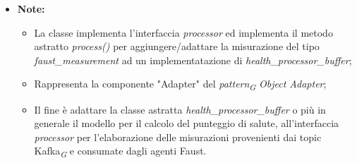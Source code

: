 \begin{itemize}
\begin{itemize}
\begin{itemize}
    \end{itemize}
    \item\textbf{Note:}
        \begin{itemize}
            \item La classe implementa l'interfaccia \textit{processor} ed implementa il metodo astratto \textit{process()} per aggiungere/adattare la misurazione del tipo \textit{faust\_measurement} ad un implementatazione di \textit{health\_processor\_buffer};
            \item Rappresenta la componente "Adapter" del \textit{pattern}\textsubscript{\textit{G}} \textit{Object Adapter};
            \item Il fine è adattare la classe astratta \textit{health\_processor\_buffer} o più in generale il modello per il calcolo del punteggio di salute, all'interfaccia \textit{processor} per l'elaborazione delle misurazioni provenienti dai topic Kafka\textsubscript{\textit{G}} e consumate dagli agenti Faust.
        \end{itemize}
    \end{itemize}
\end{itemize}